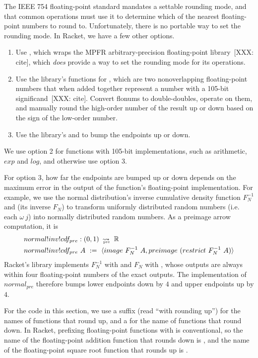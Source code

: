 The IEEE 754 floating-point standard mandates a settable rounding mode, and that common operations must use it to determine which of the nearest floating-point numbers to round to.
Unfortunately, there is no portable way to set the rounding mode.
In Racket, we have a few other options.
\begin{enumerate}
	\item Use , which wraps the MPFR arbitrary-precision floating-point library~[XXX: cite], which \emph{does} provide a way to set the rounding mode for its operations.
	\item Use the  library's functions for , which are two nonoverlapping floating-point numbers that when added together represent a number with a 105-bit significand~[XXX: cite].
	Convert flonums to double-doubles, operate on them, and manually round the high-order number of the result up or down based on the sign of the low-order number.
	\item Use the  library's  and  to bump the endpoints up or down.
\end{enumerate}
We use option 2 for functions with 105-bit implementations, such as arithmetic, $exp$ and $log$, and otherwise use option 3.

For option 3, how far the endpoints are bumped up or down depends on the maximum error in the output of the function's floating-point implementation.
For example, we use the normal distribution's inverse cumulative density function $F_N^{-1}$ and (its inverse $F_N$) to transform uniformly distributed random numbers (i.e. each $\omega~j$) into normally distributed random numbers.
As a preimage arrow computation, it is
\begin{equation}
\begin{aligned}
	&normal!inv!cdf_{pre} : (0,1)~\operatorname{\rightsquigarrow_{\mspace{-20mu}_\mathrm{pre}}}~\mathbb{R} \\
	&normal!inv!cdf_{pre}~A\ :=\ \langle{image~F_N^{-1}~A, preimage~(restrict~F_N^{-1}~A)}\rangle
\end{aligned}
\label{eqn:normal-inv-cdf-pre}
\end{equation}
Racket's  library implements $F_N^{-1}$ with  and $F_N$ with , whose outputs are always within four floating-point numbers of the exact outputs.
The implementation of $normal_{pre}$ therefore bumps lower endpoints down by $4$ and upper endpoints up by $4$.

For the code in this section, we use a  suffix (read ``with rounding up'') for the names of functions that round up, and a  for the name of functions that round down.
In Racket, prefixing floating-point functions with  is conventional, so the name of the floating-point addition function that rounds down is , and the name of the floating-point square root function that rounds up is .

